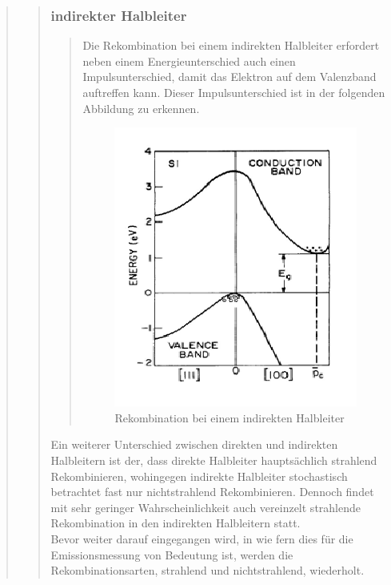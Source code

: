 \begin{quote}
\begin{quote}
\begin{quote}
            
            \end{quote}       
        
            \subsubsection{indirekter Halbleiter}
            \begin{quote}
            Die Rekombination bei einem indirekten Halbleiter erfordert neben
            einem Energieunterschied auch einen Impulsunterschied, damit das
            Elektron auf dem Valenzband auftreffen kann. Dieser
            Impulsunterschied ist in der folgenden Abbildung zu erkennen.
            
            \begin{figure}[H]
                    \centering
                        \includegraphics[scale=0.73, trim = 1cm 1cm 1.5cm 0cm,
                        clip]{./Emissionsbilder/restliches/indirekt.png}
                        \caption{Rekombination bei einem indirekten Halbleiter}
                            \label{fig:./Emissionsbilder/restliches/indirekt.png}
            \end{figure}
            
            \end{quote}       
            
            Ein weiterer Unterschied zwischen direkten und indirekten
            Halbleitern ist der, dass direkte Halbleiter hauptsächlich
            strahlend Rekombinieren, wohingegen indirekte Halbleiter
            stochastisch betrachtet fast nur nichtstrahlend Rekombinieren.
            Dennoch findet mit sehr geringer Wahrscheinlichkeit auch vereinzelt
            strahlende Rekombination in den indirekten Halbleitern statt.\\
            Bevor weiter darauf eingegangen wird, in wie fern dies für die
            Emissionsmessung von Bedeutung ist, werden die Rekombinationsarten,
            strahlend und nichtstrahlend, wiederholt.
            

\end{quote}
\end{quote}
